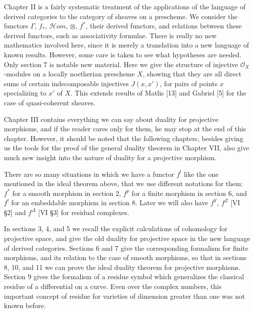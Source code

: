 \documentclass[12pt]{book}
\newcommand{\sheaf}[1]{\mathcal{#1}}
\begin{document}
Chapter II is a fairly systematic treatment of the applications of the language of derived categories to the category of sheaves on a prescheme. We consider the functors \(\Gamma\), \(f_{*}\), \(\mathcal{H}\textit{om}\), \(\otimes\), \(f^{*}\), their derived functors, and relations between these derived functors, such as associativity formulae. There is really no new mathematics involved here, since it is merely a translation into a new language of known results. However, some care is taken to see what hypotheses are needed. Only section 7 is notable new material. Here we give the structure of injective \(\sheaf{O}_X\)-modules on a locally noetherian prescheme \(X\), showing that they are all direct sums of certain indecomposable injectives \(J(x,x')\), for pairs of points \(x\) specializing to \(x'\) of \(X\). This extends results of Matlis [13] and Gabriel [5] for the case of quasi-coherent sheaves.

\setcounter{page}{15}

Chapter III contains everything we can say about duality for projective morphisms, and if the reader cares only for them, he may stop at the end of this chapter. However, it should be noted that the following chapters, besides giving us the tools for the proof of the general duality theorem in Chapter VII, also give much new insight into the nature of duality for a projective morphism.

There are so many situations in which we have a functor \(f^{!}\) like the one mentioned in the ideal theorem above, that we use different notations for them: \(f^{*}\) for a smooth morphism in section 2, \(f^{p}\) for a finite morphism in section 6, and \(f^{!}\) for an embeddable morphism in section 8. Later we will also have \(f^{Y}\), \(f^{Z}\) [VI \S2] and \(f^{\Delta}\) [VI \S3] for residual complexes.

In sections 3, 4, and 5 we recall the explicit calculations of cohomology for projective space, and give the old duality for projective space in the new language of derived categories. Sections 6 and 7 give the corresponding formalism for finite morphisms, and its relation to the case of smooth morphisms, so that in sections 8, 10, and 11 we can prove the ideal duality theorem for projective morphisms. Section 9 gives the formalism of a residue symbol which generalizes the classical residue of a differential on a curve. Even over the complex numbers, this important concept of residue for varieties of dimension greater than one was not known before.
\end{document}
